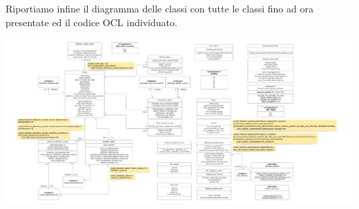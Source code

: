 \documentclass{article}
\begin{document}
   Riportiamo infine il diagramma delle classi con tutte le classi fino ad ora presentate ed il
   codice OCL individuato.

\hfill \break
\hfill \break
    
    \begin{center}
        \includegraphics[width=\textheight,height=\textwidth,keepaspectratio=true, angle=90]{class diagram/Class diagram complessivo.png}
    \end{center}
    
    
    
    
      
\end{document}

